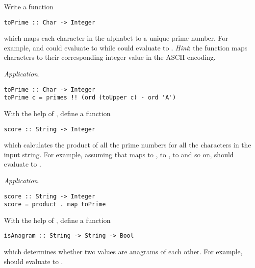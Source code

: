 \begin{parts}
    \begin{subparts}
        \subpart[4] Write a function 
        \vspace*{0.2cm}
        \begin{verbatim}
toPrime :: Char -> Integer
        \end{verbatim}	
        \vspace*{0.2cm}
        which maps each character in the alphabet to a unique prime number. For example,  and  could evaluate to  while  could evaluate to . \emph{Hint}: the  function maps characters to their corresponding integer value in the ASCII encoding.  \droppoints 
        
        \begin{solution}
            \emph{Application.} 
            \begin{verbatim}
toPrime :: Char -> Integer
toPrime c = primes !! (ord (toUpper c) - ord 'A')
            \end{verbatim}
        \end{solution}
        
        \subpart[3] With the help of , define a function
        \vspace*{0.2cm}
        \begin{verbatim}
score :: String -> Integer
        \end{verbatim}
        \vspace*{0.2cm}	
        which calculates the product of all the prime numbers for all the characters in the input string. For example, assuming that  maps  to ,  to ,  to  and so on,  should evaluate to . \droppoints 
        
        \begin{solution}
            \emph{Application.} 
            \begin{verbatim}
score :: String -> Integer
score = product . map toPrime
            \end{verbatim}
        \end{solution}
    
        \subpart[2] With the help of , define a function 
        \vspace*{0.2cm}
        \begin{verbatim}
isAnagram :: String -> String -> Bool
        \end{verbatim}
        \vspace*{0.2cm}	    
        which determines whether two  values are anagrams of each other. For example,  should evaluate to . \droppoints 
    

\end{subparts}
\end{parts}
